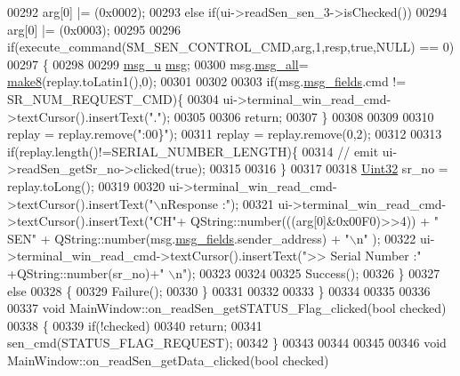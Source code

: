 \begin{DoxyCode}
00292     arg[0] |= (0x0002);
00293     \textcolor{keywordflow}{else} \textcolor{keywordflow}{if}(ui->readSen\_sen\_3->isChecked())
00294     arg[0] |= (0x0003);
00295 
00296      \textcolor{keywordflow}{if}(execute\_command(SM\_SEN\_CONTROL\_CMD,arg,1,resp,\textcolor{keyword}{true},NULL) == 0)
00297      \{
00298 
00299           \hyperlink{a00001_da/d2a/a00086}{msg\_u} \hyperlink{a00006_a6134b74dbfffbaf333e169bd09597b53}{msg};
00300           msg.\hyperlink{a00001_a2763c4336b9376a5385ff279ba0a6591}{msg\_all}= \hyperlink{a00006_aebce94d5e6af7afff661daf74b208de1}{make8}(replay.toLatin1(),0);
00301 
00302 
00303           \textcolor{keywordflow}{if}(msg.\hyperlink{a00001_afe8839ab9699466e2c9efd2327606b8e}{msg\_fields}.cmd != SR\_NUM\_REQUEST\_CMD)\{
00304               ui->terminal\_win\_read\_cmd->textCursor().insertText(\textcolor{stringliteral}{"."});
00305 
00306               \textcolor{keywordflow}{return};
00307           \}
00308 
00309 
00310            replay = replay.remove(\textcolor{stringliteral}{":00\}"});
00311            replay = replay.remove(0,2);
00312 
00313           \textcolor{keywordflow}{if}(replay.length()!=SERIAL\_NUMBER\_LENGTH)\{
00314              \textcolor{comment}{//   emit ui->readSen\_getSr\_no->clicked(true);}
00315 
00316            \}
00317 
00318           \hyperlink{a00001_ab56a7153a5b218eac7698ff141009735}{Uint32} sr\_no = replay.toLong();
00319 
00320           ui->terminal\_win\_read\_cmd->textCursor().insertText(\textcolor{stringliteral}{"\(\backslash\)nResponse :"});
00321           ui->terminal\_win\_read\_cmd->textCursor().insertText(\textcolor{stringliteral}{"CH"}+ QString::number(((arg[0]&0x00F0)>>4)) + \textcolor{stringliteral}{
      " SEN"} + QString::number(msg.\hyperlink{a00001_afe8839ab9699466e2c9efd2327606b8e}{msg\_fields}.sender\_address) + \textcolor{stringliteral}{"\(\backslash\)n"} );
00322           ui->terminal\_win\_read\_cmd->textCursor().insertText(\textcolor{stringliteral}{">> Serial Number :"} +QString::number(sr\_no)+\textcolor{stringliteral}{"
      \(\backslash\)n"});
00323 
00324 
00325         Success();
00326      \}
00327      \textcolor{keywordflow}{else}
00328      \{
00329         Failure();
00330      \}
00331 
00332 
00333 \}
00334 
00335 
00336 
00337 \textcolor{keywordtype}{void} MainWindow::on\_readSen\_getSTATUS\_Flag\_clicked(\textcolor{keywordtype}{bool} checked)
00338 \{
00339     \textcolor{keywordflow}{if}(!checked)
00340         \textcolor{keywordflow}{return};
00341        sen\_cmd(STATUS\_FLAG\_REQUEST);
00342 \}
00343 
00344 
00345 
00346 \textcolor{keywordtype}{void} MainWindow::on\_readSen\_getData\_clicked(\textcolor{keywordtype}{bool} checked)

\end{DoxyCode}
